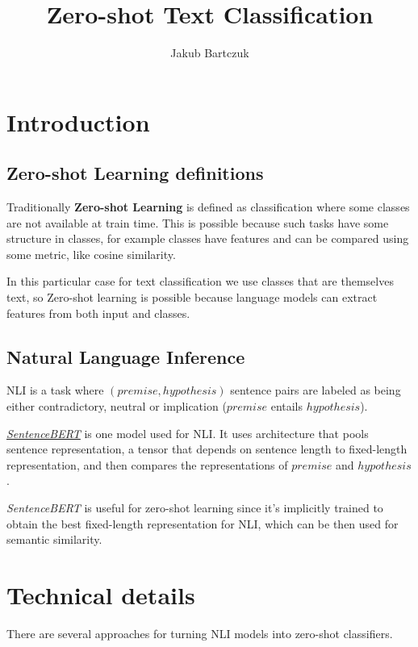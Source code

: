 \documentclass[11pt]{article}
\title{Zero-shot Text Classification}
\author{Jakub Bartczuk}
\begin{document}
\maketitle

\section{Introduction}

\subsection{Zero-shot Learning definitions}

Traditionally \textbf{Zero-shot Learning} is defined as classification where some classes are not available at train time. This is possible because such tasks have some structure in classes, for example classes have features and can be compared using some metric, like cosine similarity.

In this particular case for text classification we use classes that are themselves text, so Zero-shot learning is possible because language models can extract features from both input and classes. 

\subsection{Natural Language Inference}

NLI is a task where $(premise, hypothesis)$ sentence pairs are labeled as being either contradictory, neutral or implication ($premise$ entails $hypothesis$).

\href{https://arxiv.org/abs/1908.10084}{\textit{SentenceBERT}} is one model used for NLI. It uses architecture that pools sentence representation, a tensor that depends on sentence length to fixed-length representation, and then compares the representations of $premise$ and $hypothesis$. 

\textit{SentenceBERT} is useful for zero-shot learning since it's implicitly trained to obtain the best fixed-length representation for NLI, which can be then used for semantic similarity.

\section{Technical details}

There are several approaches for turning NLI models into zero-shot classifiers.
\end{document}
